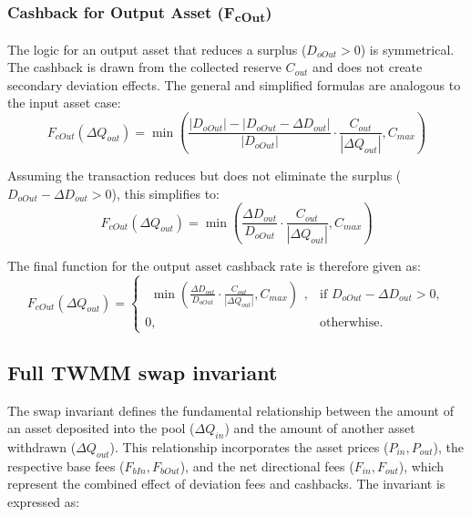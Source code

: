 \subsubsection*{Cashback for Output Asset (F\textsubscript{cOut})}
The logic for an output asset that reduces a surplus ($D_{oOut} > 0$) is symmetrical. The cashback is drawn from the collected reserve $C_{out}$ and does not create secondary deviation effects. The general and simplified formulas are analogous to the input asset case:
\begin{equation}
	\label{eq:invariant_swap_cashback_out_function}
	F_{cOut}(\Delta Q_{out}) = \min\left(\frac{\lvert D_{oOut} \rvert - \lvert D_{oOut} - \Delta D_{out} \rvert}{ \lvert D_{oOut} \rvert} \cdot \frac{C_{out}}{|\Delta Q_{out}|}, C_{max}\right)
\end{equation}

Assuming the transaction reduces but does not eliminate the surplus ($D_{oOut} - \Delta D_{out} > 0$), this simplifies to:
\begin{equation}
	\label{eq:invariant_swap_cashback_out_function_simplified}
	F_{cOut}(\Delta Q_{out}) = \min\left(\frac{ \Delta D_{out}}{ D_{oOut}} \cdot \frac{C_{out}}{|\Delta Q_{out}|}, C_{max}\right)
\end{equation}

The final function for the output asset cashback rate is therefore given as:
\begin{equation}
	\label{eq:swap_invariant_cashback_out_function_final}
	F_{cOut}(\Delta Q_{out}) = \begin{cases}
		\begin{aligned} \min\left(\frac{ \Delta D_{out}}{ D_{oOut}} \cdot \frac{C_{out}}{|\Delta Q_{out}|}, C_{max}\right) \end{aligned}, & \text{if } D_{oOut} - \Delta D_{out} > 0, \\
		0, & \text{otherwhise.}
	\end{cases}	
\end{equation}

\subsection{Full TWMM swap invariant}
The swap invariant defines the fundamental relationship between the amount of an asset deposited into the pool ($\Delta Q_{in}$) and the amount of another asset withdrawn ($\Delta Q_{out}$). This relationship incorporates the asset prices ($P_{in}, P_{out}$), the respective base fees ($F_{bIn}, F_{bOut}$), and the net directional fees ($F_{in}, F_{out}$), which represent the combined effect of deviation fees and cashbacks. The invariant is expressed as:


